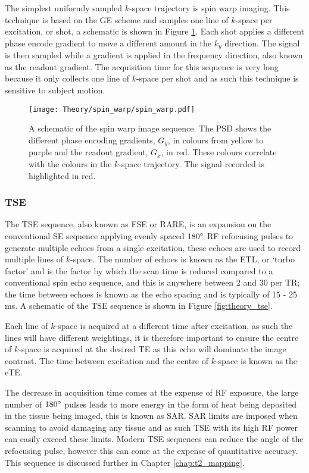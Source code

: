 The simplest uniformly sampled $k$-space trajectory is spin warp imaging. This technique is based on the \ac{GE} scheme and samples one line of $k$-space per excitation, or shot, a schematic is shown in Figure \ref{fig:theory_spin_warp}. Each shot applies a different phase encode gradient to move a different amount in the $k_y$ direction. The signal is then sampled while a gradient is applied in the frequency direction, also known as the readout gradient. The acquisition time for this sequence is very long because it only collects one line of $k$-space per shot and as such this technique is sensitive to subject motion.

\begin{figure}[H]
	\centering
	\texttt{[image: Theory/spin\_warp/spin\_warp.pdf]}
	\caption{A schematic of the spin warp image sequence. The \ac*{PSD} shows the different phase encoding gradients, $G_y$, in colours from yellow to purple and the readout gradient, $G_x$, in red. These colours correlate with the colours in the $k$-space trajectory. The signal recorded is highlighted in red.}
	\label{fig:theory_spin_warp}	
\end{figure}

\subsubsection{\ac*{TSE}}
\label{subsubsec:theory_tse}
The \ac{TSE} sequence, also known as \ac{FSE} or \ac{RARE}, is an expansion on the conventional \ac{SE} sequence applying evenly spaced $180\degree${ }\ac{RF} refocusing pulses to generate multiple echoes from a single excitation, these echoes are used to record multiple lines of $k$-space. The number of echoes is known as the \ac{ETL}, or `turbo factor' and is the factor by which the scan time is reduced compared to a conventional spin echo sequence, and this is anywhere between 2 and 30 per \ac{TR}; the time between echoes is known as the echo spacing and is typically of 15 - 25 ms. A schematic of the \ac{TSE} sequence is shown in Figure \ref{fig:theory_tse}.

Each line of $k$-space is acquired at a different time after excitation, as such the lines will have different \ttwo weightings, it is therefore important to ensure the centre of $k$-space is acquired at the desired \ac{TE} as this echo will dominate the image contrast. The time between excitation and the centre of $k$-space is known as the \ac{eTE}.

The decrease in acquisition time comes at the expense of \ac{RF} exposure, the large number of $180\degree{ }$ pulses leads to more energy in the form of heat being deposited in the tissue being imaged, this is known as \ac{SAR}. \ac{SAR} limits are imposed when scanning to avoid damaging any tissue and as such \ac{TSE} with its high \ac{RF} power can easily exceed these limits. Modern \ac{TSE} sequences can reduce the angle of the refocusing pulse, however this can come at the expense of quantitative accuracy. This sequence is discussed further in Chapter \ref{chap:t2_mapping}.


